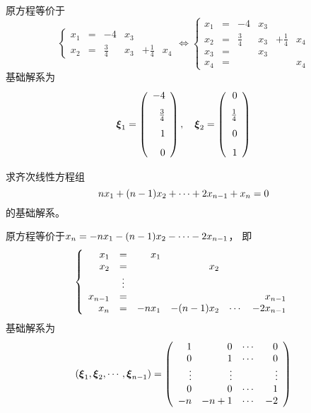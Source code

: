 \begin{frame}
\begin{jie}[续]
原方程等价于
$$\left\{
  \begin{array}{rcrcrc}
    x_1&=&-4&x_3&&\\[0.1in]
    x_2&=&\frac34&x_3&+\frac14&x_4
  \end{array}
\right.  \Leftrightarrow
\left\{
  \begin{array}{rcrcrc}
    x_1&=&-4&x_3&&\\[0.1in]
    x_2&=&\frac34&x_3&+\frac14&x_4\\[0.1in]
    x_3&=&&x_3&&\\[0.1in]
    x_4&=&&&&x_4      
  \end{array}
\right.
$$
基础解系为
$$
\boldsymbol{\xi}_1 = \left(
  \begin{array}{r}
    -4\\[0.1in]
    \frac34\\[0.1in]
    1\\[0.1in]
    0
  \end{array}
\right), \quad \boldsymbol{\xi}_2 = \left(
  \begin{array}{r}
    0\\[0.1in]
    \frac14\\[0.1in]
    0\\[0.1in]
    1
  \end{array}
\right)
$$
\end{jie}
\end{frame}

\begin{frame}
\begin{li}
  求齐次线性方程组
  $$
  nx_1+(n-1)x_2+\cdots+2x_{n-1}+x_n=0
  $$
  的基础解系。      
\end{li}
\pause 
\begin{jie}
原方程等价于$x_n=-nx_1-(n-1)x_2-\cdots-2x_{n-1}$， 即
$$
\left\{
  \begin{array}{rcrrrr}
    x_1&=&x_1&&&\\
    x_2&=&&x_2&&\\
       &\vdots&&&&\\
    x_{n-1}&=&&&&x_{n-1}\\      
    x_n&=&-nx_1&-(n-1)x_2&\cdots&-2x_{n-1}
  \end{array}    
\right.
$$
基础解系为
$$
(\boldsymbol{\xi}_1,\boldsymbol{\xi}_2,\cdots,\boldsymbol{\xi}_{n-1})=\left(
  \begin{array}{rrrr}
    1&0&\cdots&0\\
    0&1&\cdots&0\\
    \vdots&\vdots&&\vdots\\
    0&0&\cdots&1\\
    -n&-n+1&\cdots&-2
  \end{array}
\right)
$$
\end{jie}
\end{frame}

